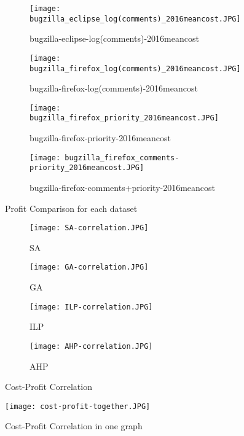\begin{figure*}[h]
\begin{subfigure}{\columnwidth}
\texttt{[image: bugzilla\_eclipse\_log(comments)\_2016meancost.JPG]}
\caption{bugzilla-eclipse-log(comments)-2016meancost}
\label{fig:subim1}
\end{subfigure}
\begin{subfigure}{\columnwidth}
\texttt{[image: bugzilla\_firefox\_log(comments)\_2016meancost.JPG]}
\caption{bugzilla-firefox-log(comments)-2016meancost}
\label{fig:subim2}
\end{subfigure}
\begin{subfigure}{\columnwidth}
\texttt{[image: bugzilla\_firefox\_priority\_2016meancost.JPG]}
\caption{bugzilla-firefox-priority-2016meancost}
\label{fig:subim3}
\end{subfigure}
\begin{subfigure}{\columnwidth}
\texttt{[image: bugzilla\_firefox\_comments-priority\_2016meancost.JPG]}
\caption{bugzilla-firefox-comments+priority-2016meancost}
\label{fig:subim4}
\end{subfigure}

\caption{Profit Comparison for each dataset}
\label{fig:image1}
\end{figure*}

\begin{figure*}[h]
\begin{subfigure}{\columnwidth}
\texttt{[image: SA-correlation.JPG]}
\caption{SA}
\label{fig:subim5}
\end{subfigure}
\begin{subfigure}{\columnwidth}
\texttt{[image: GA-correlation.JPG]}
\caption{GA}
\label{fig:subim6}
\end{subfigure}
\begin{subfigure}{\columnwidth}
\texttt{[image: ILP-correlation.JPG]}
\caption{ILP}
\label{fig:subim7}
\end{subfigure}
\begin{subfigure}{\columnwidth}
\texttt{[image: AHP-correlation.JPG]}
\caption{AHP}
\label{fig:subim8}
\end{subfigure}

\caption{Cost-Profit Correlation}
\label{fig:image2}
\end{figure*}

\begin{figure*}[h]
\texttt{[image: cost-profit-together.JPG]}
\caption{Cost-Profit Correlation in one graph}
\label{fig:image3}
\end{figure*}

